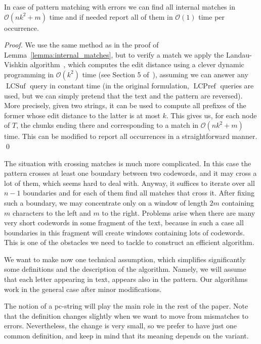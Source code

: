 \documentclass[runningheads]{llncs}
\DeclareMathOperator{\LCPref}{LCPref}
\DeclareMathOperator{\LCSuf}{LCSuf}
\begin{document}
\begin{lemma}\label{lemma:internal_matches_errors}
In case of pattern matching with errors we can find all internal matches in $\mathcal{O}(nk^2+m)$ time and if needed report all of them in $\mathcal{O}(1)$ time per occurrence.
\end{lemma}
\begin{proof}
We use the same method as in the proof of Lemma~\ref{lemma:internal_matches}, but to verify a match we apply the Landau-Vishkin algorithm~\cite{Landau}, which computes the edit distance using a clever dynamic programming in $\mathcal{O}(k^{2})$ time (see Section 5 of~\cite{ColeHariharan}), assuming we can answer any $\LCSuf$ query in constant time (in the original formulation, $\LCPref$ queries are used, but we can simply pretend that the text and the pattern are reversed). More precisely, given two strings, it can be used to compute all prefixes of the former whose edit distance to the latter is at most $k$. This gives us, for each node of $T$, the chunks ending there and corresponding to a match in $\mathcal{O}(nk^{2}+m)$ time. This can be modified to report all occurrences in a straightforward manner. 
\qed
\end{proof}

The situation with crossing matches is much more complicated. In this case the pattern crosses at least one boundary between two codewords, and it may cross a lot of them, which seems hard to deal with. Anyway, it suffices to iterate over all $n-1$ boundaries and for each of them find all matches that cross it. After fixing such a boundary, we may concentrate only on a window of length $2m$ containing $m$ characters to the left and $m$ to the right. Problems arise when there are many very short codewords in some fragment of the text, because in such a case all boundaries in this fragment will create windows containing lots of codewords. This is one of the obstacles we need to tackle to construct an efficient algorithm.

We want to make now one technical assumption, which simplifies significantly some definitions and the description of the algorithm. Namely, we will assume that each letter appearing in text, appears also in the pattern. Our algorithms work in the general case after minor modifications.

The notion of a pc-string will play the main role in the rest of the paper. Note that the definition changes slightly when we want to move from mismatches to errors. Nevertheless, the change is very small, so we prefer to have just one common definition, and keep in mind that its meaning depends on the variant.
\end{document}
